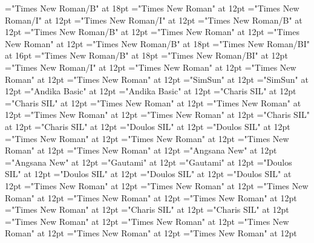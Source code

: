 \documentclass[a4paper,twoside]{article}
\begin{document}
\font\ChapterNumberParagraphscrSectioncolumnsscrBookscrBody="Times New Roman/B" at 18pt
\font\ParagraphscrSectioncolumnsscrBookscrBody="Times New Roman" at 12pt
\font\spanParallelPassageReferencescrSectioncolumnsscrBookscrBody="Times New Roman/I" at 12pt
\font\ParallelPassageReferencescrSectioncolumnsscrBookscrBody="Times New Roman/I" at 12pt
\font\spanSectionHeadscrSectioncolumnsscrBookscrBody="Times New Roman/B" at 12pt
\font\SectionHeadscrSectioncolumnsscrBookscrBody="Times New Roman/B" at 12pt
\font\scrSectioncolumnsscrBookscrBody="Times New Roman" at 12pt
\font\columnsscrBookscrBody="Times New Roman" at 12pt
\font\spanTitleMainscrBookscrBody="Times New Roman/B" at 18pt
\font\TitleSecondaryTitleMainscrBookscrBody="Times New Roman/BI" at 16pt
\font\TitleMainscrBookscrBody="Times New Roman/B" at 18pt
\font\scrBookCodescrBookscrBody="Times New Roman/BI" at 12pt
\font\scrBookNamescrBookscrBody="Times New Roman/I" at 12pt
\font\scrBookscrBody="Times New Roman" at 12pt
\font\imgpicturedivpictureLeft="Times New Roman" at 12pt
\font\picturepictureRight="Times New Roman" at 12pt
\font\spanzhCN="SimSun" at 12pt
\font\divzhCN="SimSun" at 12pt
\font\spanzhCNpinyin="Andika Basic" at 12pt
\font\divzhCNpinyin="Andika Basic" at 12pt
\font\spanvi="Charis SIL" at 12pt
\font\divvi="Charis SIL" at 12pt
\font\spanur="Times New Roman" at 12pt
\font\divur="Times New Roman" at 12pt
\font\spanurxind="Times New Roman" at 12pt
\font\divurxind="Times New Roman" at 12pt
\font\spantr="Charis SIL" at 12pt
\font\divtr="Charis SIL" at 12pt
\font\spantrfonipa="Doulos SIL" at 12pt
\font\divtrfonipa="Doulos SIL" at 12pt
\font\spantrfonipaxemic="Times New Roman" at 12pt
\font\divtrfonipaxemic="Times New Roman" at 12pt
\font\spantpi="Times New Roman" at 12pt
\font\divtpi="Times New Roman" at 12pt
\font\spanth="Angsana New" at 12pt
\font\divth="Angsana New" at 12pt
\font\spante="Gautami" at 12pt
\font\divte="Gautami" at 12pt
\font\spanseh="Doulos SIL" at 12pt
\font\divseh="Doulos SIL" at 12pt
\font\spansehfonipaxetic="Doulos SIL" at 12pt
\font\divsehfonipaxetic="Doulos SIL" at 12pt
\font\spanru="Times New Roman" at 12pt
\font\divru="Times New Roman" at 12pt
\font\spanqvz="Times New Roman" at 12pt
\font\divqvz="Times New Roman" at 12pt
\font\spanqaaxper="Times New Roman" at 12pt
\font\divqaaxper="Times New Roman" at 12pt
\font\spanqaaxmam="Charis SIL" at 12pt
\font\divqaaxmam="Charis SIL" at 12pt
\font\spanqaaxcam="Times New Roman" at 12pt
\font\divqaaxcam="Times New Roman" at 12pt
\font\spanqaaQMxpersp="Times New Roman" at 12pt
\font\divqaaQMxpersp="Times New Roman" at 12pt
\font\spanqaaQMxperbk="Times New Roman" at 12pt
\end{document}
